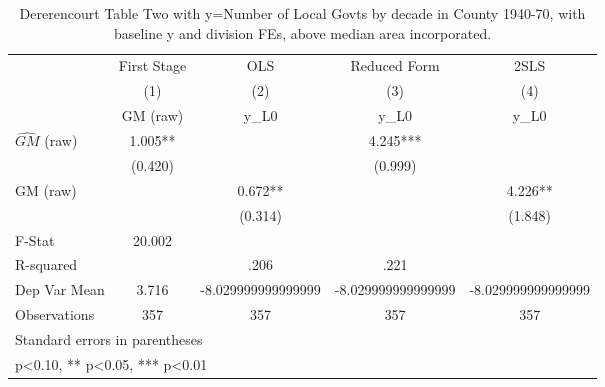\begin{table}[htbp]\centering
\def\sym#1{\ifmmode^{#1}\else\(^{#1}\)\fi}
\caption{Dererencourt Table Two with y=Number of Local Govts by decade in County 1940-70, with baseline y and division FEs, above median area incorporated.}
\begin{tabular}{l*{4}{c}}
\toprule
                    & First Stage   &         OLS   &Reduced Form   &        2SLS   \\
                    &\multicolumn{1}{c}{(1)}&\multicolumn{1}{c}{(2)}&\multicolumn{1}{c}{(3)}&\multicolumn{1}{c}{(4)}\\
                    &\multicolumn{1}{c}{GM  (raw)}&\multicolumn{1}{c}{y\_L0}&\multicolumn{1}{c}{y\_L0}&\multicolumn{1}{c}{y\_L0}\\
\midrule
$\hat{GM}$ (raw)    &       1.005** &               &       4.245***&               \\
                    &     (0.420)   &               &     (0.999)   &               \\
\addlinespace
GM  (raw)           &               &       0.672** &               &       4.226** \\
                    &               &     (0.314)   &               &     (1.848)   \\
\midrule
F-Stat              &      20.002   &               &               &               \\
R-squared           &               &        .206   &        .221   &               \\
Dep Var Mean        &       3.716   &-8.029999999999999   &-8.029999999999999   &-8.029999999999999   \\
Observations        &         357   &         357   &         357   &         357   \\
\bottomrule
\multicolumn{5}{l}{\footnotesize Standard errors in parentheses}\\
\multicolumn{5}{l}{\footnotesize * p<0.10, ** p<0.05, *** p<0.01}\\
\end{tabular}
\end{table}
